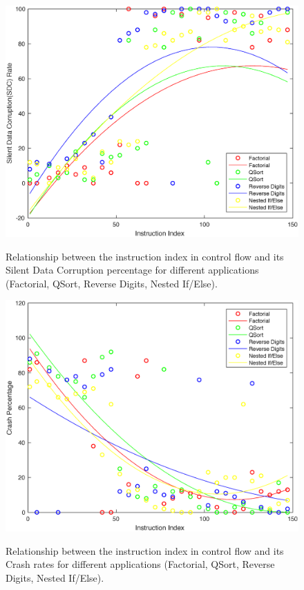 \begin{figure}[!t]
\begin{center}
\label{fig:plan_8}\includegraphics[scale=0.3]{./figures/figure_2_22.eps}
\end{center}
\caption{Relationship between the instruction index in control flow and its Silent Data Corruption percentage for different applications (Factorial, QSort, Reverse Digits, Nested If/Else).}
\label{fig:plan_8}
\end{figure}

\begin{figure}[!t]
\begin{center}
\label{fig:plan_5}\includegraphics[scale=0.3]{./figures/figure_3_33.eps}
\end{center}
\caption{Relationship between the instruction index in control flow and its Crash rates for different applications (Factorial, QSort, Reverse Digits, Nested If/Else).}
\label{fig:plan_5}
\end{figure}

